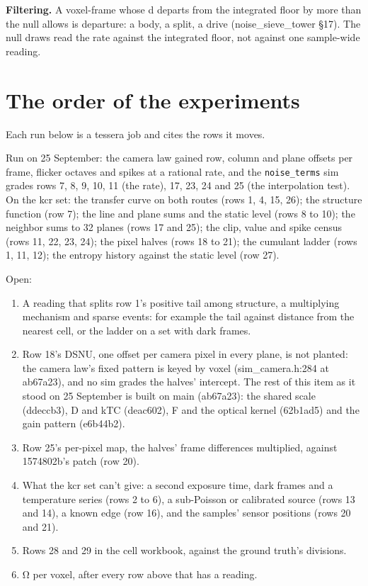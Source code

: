 \textbf{Filtering.} A voxel-frame whose d departs from the integrated floor by more than the null allows is departure: a body, a split, a drive (noise\_\allowbreak{}sieve\_\allowbreak{}tower §17). The null draws read the rate against the integrated floor, not against one sample-wide reading.

\section{\texorpdfstring{The order of the experiments}{The order of the experiments}}

Each run below is a tessera job and cites the rows it moves.

Run on 25 September: the camera law gained row, column and plane offsets per frame, flicker octaves and spikes at a rational rate, and the \texttt{noise\_\allowbreak{}terms} sim grades rows 7, 8, 9, 10, 11 (the rate), 17, 23, 24 and 25 (the interpolation test). On the kcr set: the transfer curve on both routes (rows 1, 4, 15, 26); the structure function (row 7); the line and plane sums and the static level (rows 8 to 10); the neighbor sums to 32 planes (rows 17 and 25); the clip, value and spike census (rows 11, 22, 23, 24); the pixel halves (rows 18 to 21); the cumulant ladder (rows 1, 11, 12); the entropy history against the static level (row 27).

Open:

\begin{enumerate}
\item A reading that splits row 1's positive tail among structure, a multiplying mechanism and sparse events: for example the tail against distance from the nearest cell, or the ladder on a set with dark frames.
\item Row 18's DSNU, one offset per camera pixel in every plane, is not planted: the camera law's fixed pattern is keyed by voxel (sim\_\allowbreak{}camera.h:284 at ab67a23), and no sim grades the halves' intercept. The rest of this item as it stood on 25 September is built on main (ab67a23): the shared scale (ddeccb3), D and kTC (deac602), F and the optical kernel (62b1ad5) and the gain pattern (e6b44b2).
\item Row 25's per-pixel map, the halves' frame differences multiplied, against 1574802b's patch (row 20).
\item What the kcr set can't give: a second exposure time, dark frames and a temperature series (rows 2 to 6), a sub-Poisson or calibrated source (rows 13 and 14), a known edge (row 16), and the samples' sensor positions (rows 20 and 21).
\item Rows 28 and 29 in the cell workbook, against the ground truth's divisions.
\item Ω per voxel, after every row above that has a reading.
\end{enumerate}
